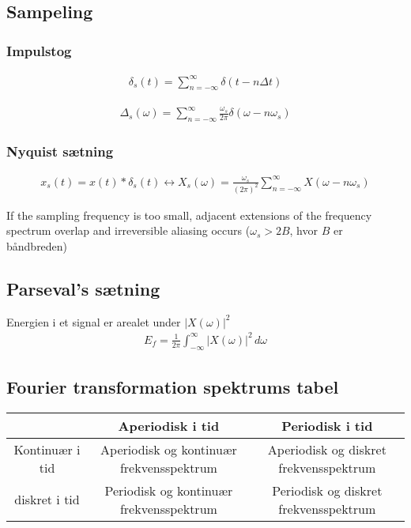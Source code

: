\subsection{Sampeling}
	\subsubsection{Impulstog}
		\begin{align}
			\delta_s(t)=\sum_{n=-\infty}^{\infty}\delta(t-n\Delta t)
		\end{align}

		\begin{align}
			\Delta_s(\omega)=\sum_{n=-\infty}^{\infty}\frac{\omega_s}{2\pi}\delta(\omega-n\omega_s)
		\end{align}

	\subsubsection{Nyquist sætning}
		\begin{align}
			x_s(t)=x(t)*\delta_s(t)\leftrightarrow X_s(\omega)=\frac{\omega_s}{(2\pi)^2}\sum_{n=-\infty}^{\infty}X(\omega-n\omega_s)
		\end{align}

		If the sampling frequency is too small, adjacent extensions of the frequency spectrum overlap and irreversible aliasing occurs ($\omega_s>2B$, hvor $B$ er båndbreden)
	
\subsection{Parseval's sætning}
	Energien i et signal er arealet under $|X(\omega)|^2$
	\begin{align}
		E_f=\frac{1}{2\pi}\int_{-\infty}^{\infty}|X(\omega)|^2\,d\omega
	\end{align}

\subsection{Fourier transformation spektrums tabel}
	\begin{tabular}{|c|c|c|}
		\hline
		&Aperiodisk i tid&Periodisk i tid\\
		\hline
		Kontinuær i tid&Aperiodisk og kontinuær frekvensspektrum&Aperiodisk og diskret frekvensspektrum\\
		\hline
		diskret i tid&Periodisk og kontinuær frekvensspektrum&Periodisk og diskret frekvensspektrum\\
		\hline
	\end{tabular}

